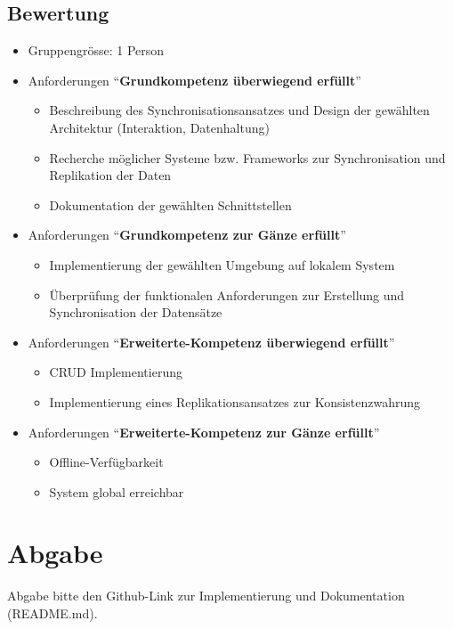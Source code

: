 \subsection{Bewertung}
\begin{itemize}
    \item Gruppengrösse: 1 Person
    \item Anforderungen \enquote{\textbf{Grundkompetenz überwiegend erfüllt}}
    \begin{itemize}
        \item Beschreibung des Synchronisationsansatzes und Design der gewählten Architektur (Interaktion, Datenhaltung)
        \item Recherche möglicher Systeme bzw. Frameworks zur Synchronisation und Replikation der Daten
        \item Dokumentation der gewählten Schnittstellen
    \end{itemize}
    \item Anforderungen \enquote{\textbf{Grundkompetenz zur Gänze erfüllt}}
    \begin{itemize}
        \item Implementierung der gewählten Umgebung auf lokalem System
        \item Überprüfung der funktionalen Anforderungen zur Erstellung und Synchronisation der Datensätze
    \end{itemize}
    \item Anforderungen \enquote{\textbf{Erweiterte-Kompetenz überwiegend erfüllt}}
    \begin{itemize}
        \item CRUD Implementierung
        \item Implementierung eines Replikationsansatzes zur Konsistenzwahrung
    \end{itemize}
    \item Anforderungen \enquote{\textbf{Erweiterte-Kompetenz zur Gänze erfüllt}}
    \begin{itemize}
        \item Offline-Verfügbarkeit
        \item System global erreichbar
    \end{itemize}
\end{itemize}

\section{Abgabe}

Abgabe bitte den Github-Link zur Implementierung und Dokumentation (README.md).

\clearpage
